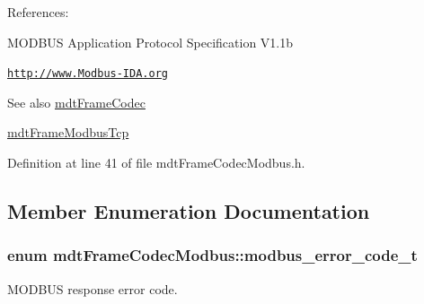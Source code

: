 References:
\begin{DoxyItemize}
\item MODBUS Application Protocol Specification V1.1b
\item \href{http://www.Modbus-IDA.org}{\tt http://www.Modbus-\/IDA.org}
\end{DoxyItemize}

\begin{DoxySeeAlso}{See also}
\hyperlink{classmdt_frame_codec}{mdtFrameCodec} 

\hyperlink{classmdt_frame_modbus_tcp}{mdtFrameModbusTcp} 
\end{DoxySeeAlso}


Definition at line 41 of file mdtFrameCodecModbus.h.



\subsection{Member Enumeration Documentation}
\hypertarget{classmdt_frame_codec_modbus_a31d8291be7f8636d5d295ce3066d7ac7}{
\subsubsection[{modbus\_\-error\_\-code\_\-t}]{\setlength{\rightskip}{0pt plus 5cm}enum {\bf mdtFrameCodecModbus::modbus\_\-error\_\-code\_\-t}}}
\label{classmdt_frame_codec_modbus_a31d8291be7f8636d5d295ce3066d7ac7}


MODBUS response error code. 

